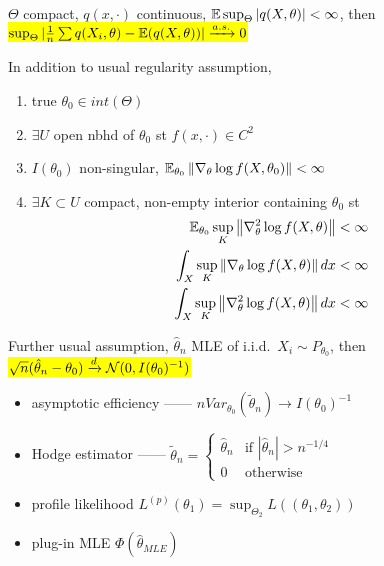 \begin{thm}
    $\Theta$ compact, $q(x, \cdot)$ continuous, $\mathbb{E}\sup_\Theta|q(X, \theta)| < \infty$, then
    \hl{$\sup_\Theta |\frac{1}{n} \sum q(X_i, \theta) - \mathbb{E}(q(X, \theta))| \xrightarrow{a.s.} 0 $}
\end{thm}

\begin{assumption}
    In addition to usual regularity assumption,
    \begin{enumerate}
        \item true $\theta_0 \in int(\Theta)$
        \item $\exists U$ open nbhd of $\theta_0$ st $f(x, \cdot) \in C^2$
        \item $I(\theta_0)$ non-singular, $\mathbb{E}_{\theta_0}\left\lVert\nabla_\theta \log f(X, \theta_0)\right\rVert < \infty$
        \item $\exists K \subset U$ compact, non-empty interior containing $\theta_0$ st
        \begin{align*}
            \mathbb{E}_{\theta_0}\sup_K \left\lVert\nabla^2_\theta \log f(X, \theta)\right\rVert < \infty \\
            \int_X \sup_K \left\lVert\nabla_\theta \log f(X, \theta)\right\rVert dx < \infty\\
            \int_X \sup_K \left\lVert\nabla^2_\theta \log f(X, \theta)\right\rVert dx < \infty
        \end{align*}
    \end{enumerate}
\end{assumption}

\begin{thm}
    Further usual assumption, $\hat{\theta}_n$ MLE of i.i.d.\ $X_i \sim P_{\theta_0}$, then\\
    \hl{$\sqrt{n}(\hat{\theta}_n - \theta_0) \xrightarrow{d} \mathcal{N}(0, I(\theta_0)^{-1})$}
\end{thm}

\begin{itemize}
    \item asymptotic efficiency ------ $n Var_{\theta_0}(\tilde \theta_n) \rightarrow I(\theta_0)^{-1}$
    \item Hodge estimator ------ $\tilde \theta_n = \begin{cases}
                                                        \hat \theta_n & \text{if } |\hat \theta_n| > n^{-1/4}\\
                                                        0 & \text{otherwise}
    \end{cases}$
    \item profile likelihood $L^{(p)}(\theta_1) = \sup_{\Theta_2} L((\theta_1, \theta_2))$
    \item plug-in MLE $\Phi(\hat \theta_{MLE})$
\end{itemize}

